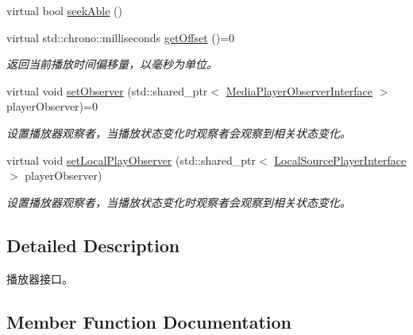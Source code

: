 \begin{DoxyCompactItemize}
virtual bool \hyperlink{classduerOSDcsSDK_1_1sdkInterfaces_1_1MediaPlayerInterface_a316fbe22c527b8fcb87abbf1b43dddbf}{seek\+Able} ()
\item 
virtual std\+::chrono\+::milliseconds \hyperlink{classduerOSDcsSDK_1_1sdkInterfaces_1_1MediaPlayerInterface_adfd47623bde33d1a871eac3c6f0f550b}{get\+Offset} ()=0
\begin{DoxyCompactList}\small\item\em 返回当前播放时间偏移量，以毫秒为单位。 \end{DoxyCompactList}\item 
virtual void \hyperlink{classduerOSDcsSDK_1_1sdkInterfaces_1_1MediaPlayerInterface_a4f211597d7bd34dc19df4798c486d1da}{set\+Observer} (std\+::shared\+\_\+ptr$<$ \hyperlink{classduerOSDcsSDK_1_1sdkInterfaces_1_1MediaPlayerObserverInterface}{Media\+Player\+Observer\+Interface} $>$ player\+Observer)=0
\begin{DoxyCompactList}\small\item\em 设置播放器观察者，当播放状态变化时观察者会观察到相关状态变化。 \end{DoxyCompactList}\item 
virtual void \hyperlink{classduerOSDcsSDK_1_1sdkInterfaces_1_1MediaPlayerInterface_ae2404d291dd57c667cf0734622db351f}{set\+Local\+Play\+Observer} (std\+::shared\+\_\+ptr$<$ \hyperlink{classduerOSDcsSDK_1_1sdkInterfaces_1_1LocalSourcePlayerInterface}{Local\+Source\+Player\+Interface} $>$ player\+Observer)
\begin{DoxyCompactList}\small\item\em 设置播放器观察者，当播放状态变化时观察者会观察到相关状态变化。 \end{DoxyCompactList}\end{DoxyCompactItemize}


\subsection{Detailed Description}
播放器接口。 

\subsection{Member Function Documentation}
\mbox{\label{classduerOSDcsSDK_1_1sdkInterfaces_1_1MediaPlayerInterface_adfd47623bde33d1a871eac3c6f0f550b}} 
